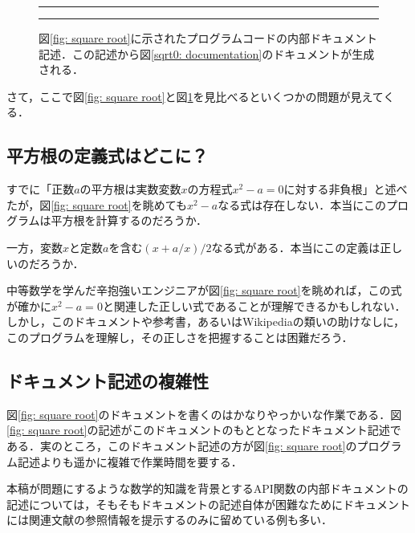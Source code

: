 \begin {figure}[tb]
  \rule {\linewidth} {1pt}
  {\color {darkblue} \small }

  \caption {図\ref {fig: square root}に示されたプログラムコードの内部ドキュメント記述．この記述から図\ref {sqrt0: documentation}のドキュメントが生成される．}
  \label {fig: square root document description}
  \rule {\linewidth} {1pt}
\end {figure}

さて，ここで図\ref {fig: square root}と図\ref {fig: square root document description}を見比べるといくつかの問題が見えてくる．

\subsection  {平方根の定義式はどこに？}
\label {ssec: definition}

すでに「正数$a$の平方根は実数変数$x$の方程式$x^2 - a = 0$に対する非負根」と述べたが，図\ref {fig: square root}を眺めても$x^2 - a$なる式は存在しない．本当にこのプログラムは平方根を計算するのだろうか．

一方，変数$x$と定数$a$を含む$(x + a / x) / 2$なる式がある．本当にこの定義は正しいのだろうか．

中等数学を学んだ辛抱強いエンジニアが図\ref {fig: square root}を眺めれば，この式が確かに$x^2 - a = 0$と関連した正しい式であることが理解できるかもしれない．しかし，このドキュメントや参考書，あるいはWikipediaの類いの助けなしに，このプログラムを理解し，その正しさを把握することは困難だろう．

\subsection  {ドキュメント記述の複雑性}
\label {ssec: complexity}

図\ref {fig: square root}のドキュメントを書くのはかなりやっかいな作業である．図\ref {fig: square root}の記述がこのドキュメントのもととなったドキュメント記述である．実のところ，このドキュメント記述の方が図\ref {fig: square root}のプログラム記述よりも遥かに複雑で作業時間を要する．

本稿が問題にするような数学的知識を背景とするAPI関数の内部ドキュメントの記述については，そもそもドキュメントの記述自体が困難なためにドキュメントには関連文献の参照情報を提示するのみに留めている例も多い．

